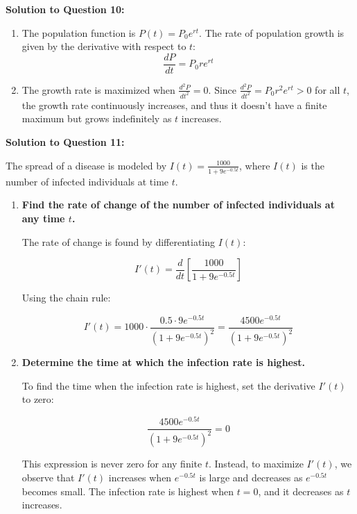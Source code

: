 \documentclass{article}
\begin{document}
    \item \textbf{Solution to Question 10:}
    \begin{enumerate}[label=(\alph*), itemsep=10pt]
        \item The population function is \( P(t) = P_0 e^{rt} \). The rate of population growth is given by the derivative with respect to \( t \):
        \[
        \frac{dP}{dt} = P_0 r e^{rt}
        \]
        
        \item The growth rate is maximized when \( \frac{d^2P}{dt^2} = 0 \). Since \( \frac{d^2P}{dt^2} = P_0 r^2 e^{rt} > 0 \) for all \( t \), the growth rate continuously increases, and thus it doesn't have a finite maximum but grows indefinitely as \( t \) increases.
    \end{enumerate}

    \item \textbf{Solution to Question 11:}

    The spread of a disease is modeled by \( I(t) = \frac{1000}{1 + 9e^{-0.5t}} \), where \( I(t) \) is the number of infected individuals at time \( t \).

    \begin{enumerate}[label=(\alph*), itemsep=10pt]
        \item \textbf{Find the rate of change of the number of infected individuals at any time \( t \).}

        The rate of change is found by differentiating \( I(t) \):

        \[
        I'(t) = \frac{d}{dt} \left[ \frac{1000}{1 + 9e^{-0.5t}} \right]
        \]

        Using the chain rule:

        \[
        I'(t) = 1000 \cdot \frac{0.5 \cdot 9e^{-0.5t}}{\left( 1 + 9e^{-0.5t} \right)^2} = \frac{4500e^{-0.5t}}{\left( 1 + 9e^{-0.5t} \right)^2}
        \]

        \item \textbf{Determine the time at which the infection rate is highest.}

        To find the time when the infection rate is highest, set the derivative \( I'(t) \) to zero:

        \[
        \frac{4500e^{-0.5t}}{\left( 1 + 9e^{-0.5t} \right)^2} = 0
        \]

        This expression is never zero for any finite \( t \). Instead, to maximize \( I'(t) \), we observe that \( I'(t) \) increases when \( e^{-0.5t} \) is large and decreases as \( e^{-0.5t} \) becomes small. The infection rate is highest when \( t = 0 \), and it decreases as \( t \) increases.
    \end{enumerate}
\end{document}
